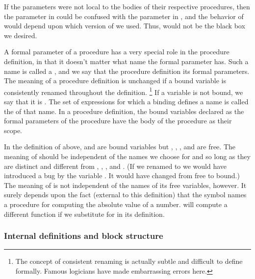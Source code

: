 If the parameters were not local to the bodies of their respective procedures, then the parameter  in  could be confused with the parameter  in , and the behavior of  would depend upon which version of  we used.
Thus,  would not be the black box we desired.

A formal parameter of a procedure has a very special role in the procedure definition, in that it doesn’t matter what name the formal parameter has.
Such a name is called a , and we say that the procedure definition  its formal parameters.
The meaning of a procedure definition is unchanged if a bound variable is consistently renamed throughout the definition.%
\footnote{
	The concept of consistent renaming is actually subtle and difficult to define formally.
	Famous logicians have made embarrassing errors here.
}
If a variable is not bound, we say that it is .
The set of expressions for which a binding defines a name is called the  of that name.
In a procedure definition, the bound variables declared as the formal parameters of the procedure have the body of the procedure as their scope.

In the definition of  above,  and  are bound variables but \code{<}, \code{-}, , and  are free.
The meaning of  should be independent of the names we choose for  and  so long as they are distinct and different from \code{<}, \code{-}, , and .
(If we renamed  to  we would have introduced a bug by  the variable .
It would have changed from free to bound.)
The meaning of  is not independent of the names of its free variables, however.
It surely depends upon the fact (external to this definition) that the symbol  names a procedure for computing the absolute value of a number.
 will compute a different function if we substitute  for  in its definition.



\subsubsection*{Internal definitions and block structure}

